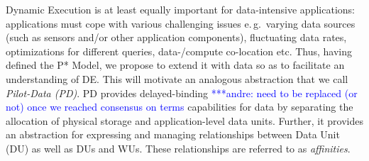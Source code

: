 \documentclass[conference,final]{IEEEtran}
\newcommand{\jhanote}[1]{ {\textcolor{red} { ***shantenu: #1 }}}
\newcommand{\alnote}[1]{ {\textcolor{blue} { ***andre: #1 }}}
\newcommand{\alnote}[1]{}
\newcommand{\jhanote}[1]{}
\begin{document}







Dynamic Execution is at least equally important for data-intensive
applications: applications must cope with various challenging issues
e.\,g.\ varying data sources (such as sensors and/or other application
components), fluctuating data rates, optimizations for different
queries, data-/compute co-location etc. Thus, having defined the P*
Model, we propose to extend it with data so as to facilitate an
understanding of DE. This will motivate an analogous abstraction that
we call \emph{Pilot-Data (PD)}. PD provides delayed-binding
\alnote{need to be replaced (or not) once we reached consensus on
  terms} capabilities for data by separating the allocation of
physical storage and application-level data units. Further, it
provides an abstraction for expressing and managing relationships
between Data Unit (DU) as well as DUs and WUs. These relationships are
referred to as \emph{affinities}.  %
\end{document}
